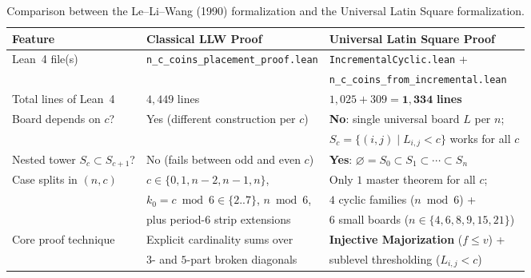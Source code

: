 \documentclass[11pt,a4paper]{article}
\theoremstyle{remark}
\begin{document}
\begin{table}[ht]
\centering
\footnotesize
\renewcommand{\arraystretch}{1.28}
\begin{tabular}{@{}lll@{}}
\toprule
\textbf{Feature} & \textbf{Classical LLW Proof}~\cite{LLW1990} & \textbf{Universal Latin Square Proof} \\
\midrule
Lean~4 file(s) & \texttt{n\_c\_coins\_placement\_proof.lean} & \texttt{IncrementalCyclic.lean} + \\
 & & \texttt{n\_c\_coins\_from\_incremental.lean} \\
Total lines of Lean~4 & $4{,}449$ lines & $1{,}025 + 309 = \mathbf{1{,}334}$ \textbf{lines} \\
Board depends on $c$? & Yes (different construction per $c$) & \textbf{No}: single universal board $L$ per $n$; \\
 & & $S_c = \{(i,j) \mid L_{i,j} < c\}$ works for all $c$ \\
Nested tower $S_c \subset S_{c+1}$? & No (fails between odd and even $c$) & \textbf{Yes}: $\varnothing = S_0 \subset S_1 \subset \cdots \subset S_n$ \\
Case splits in $(n, c)$ & $c \in \{0, 1, n-2, n-1, n\}$, & Only $1$ master theorem for all $c$; \\
 & $k_0 = c \bmod 6 \in \{2..7\}$, $n \bmod 6$, & $4$ cyclic families ($n \bmod 6$) + \\
 & plus period-$6$ strip extensions & $6$ small boards ($n \in \{4,6,8,9,15,21\}$) \\
Core proof technique & Explicit cardinality sums over & \textbf{Injective Majorization} ($f \le v$) + \\
 & $3$- and $5$-part broken diagonals & sublevel thresholding ($L_{i,j} < c$) \\
\bottomrule
\end{tabular}
\caption{Comparison between the Le--Li--Wang (1990) formalization and the Universal Latin Square formalization.}
\label{tab:comparison}
\end{table}
\end{document}
